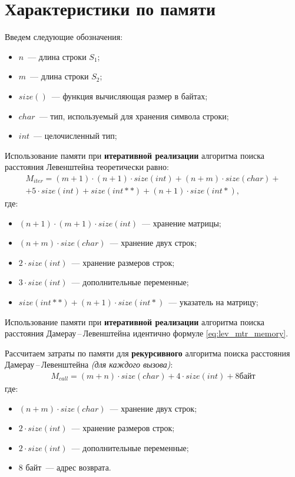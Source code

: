 \section{Характеристики по памяти}

Введем следующие обозначения:
\begin{itemize}
	\item$n$~--- длина строки $S_{1}$;
	\item$m$~--- длина строки $S_{2}$;
	\item$size()$~--- функция вычисляющая размер в байтах;
	\item $char$~--- тип, используемый для хранения символа строки;
	\item $int$~--- целочисленный тип;
\end{itemize}

Использование памяти при \textbf{итеративной реализации} алгоритма поиска расстояния Левенштейна теоретически равно:
\begin{equation}
	\label{eq:lev_mtr_memory}
	\begin{aligned}
		M_{iter} = (m + 1) \cdot (n + 1) \cdot size(int) + (n + m) \cdot size(char) + \\ + 5 \cdot size(int) + size(int **) + (n + 1) \cdot size(int *),
	\end{aligned}
\end{equation}
где: 
\begin{itemize}
	\item $(n + 1) \cdot (m + 1) \cdot size(int)$~--- хранение матрицы;
	\item $(n + m) \cdot size(char)$~--- хранение двух строк;
	\item $2 \cdot size(int)$~--- хранение размеров строк;
	\item $3 \cdot size(int)$~--- дополнительные переменные;
	\item $size(int**) + (n + 1) \cdot size(int *)$~--- указатель на матрицу;
\end{itemize}

Использование памяти при \textbf{итеративной реализации} алгоритма поиска расстояния Дамерау\,--\,Левенштейна идентично формуле \ref{eq:lev_mtr_memory}.

Рассчитаем затраты по памяти для \textbf{рекурсивного} алгоритма поиска расстояния Дамерау\,--\,Левенштейна\textit{ (для каждого вызова)}:
\begin{equation}
	\label{}
	\begin{aligned}
		M_{call} = (m + n) \cdot size(char) + 4 \cdot size(int) + 8 байт
	\end{aligned}
\end{equation}
где: 
\begin{itemize}
	\item $(n + m) \cdot size(char)$~--- хранение двух строк;
	\item $2 \cdot size(int)$~--- хранение размеров строк;
	\item $2 \cdot size(int)$~--- дополнительные переменные;
	\item 8 байт~--- адрес возврата.
\end{itemize}

